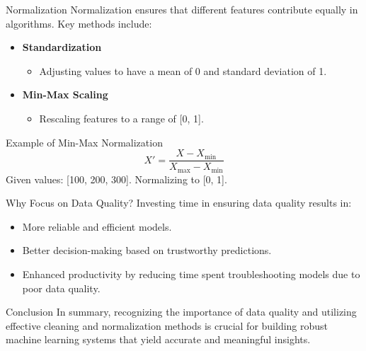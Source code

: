 \documentclass[aspectratio=169]{beamer}
\begin{document}
\begin{frame}{Normalization}
    Normalization ensures that different features contribute equally in algorithms. Key methods include:
    
    \begin{itemize}
        \item \textbf{Standardization}
            \begin{itemize}
                \item Adjusting values to have a mean of 0 and standard deviation of 1.
            \end{itemize}
        \item \textbf{Min-Max Scaling}
            \begin{itemize}
                \item Rescaling features to a range of [0, 1].
            \end{itemize}
    \end{itemize}

    \begin{block}{Example of Min-Max Normalization}
        \begin{equation}
        X' = \frac{X - X_{\text{min}}}{X_{\text{max}} - X_{\text{min}}}
        \end{equation}
        Given values: [100, 200, 300]. Normalizing to [0, 1].
    \end{block}
\end{frame}

\begin{frame}{Why Focus on Data Quality?}
    Investing time in ensuring data quality results in:
    \begin{itemize}
        \item More reliable and efficient models.
        \item Better decision-making based on trustworthy predictions.
        \item Enhanced productivity by reducing time spent troubleshooting models due to poor data quality.
    \end{itemize}
\end{frame}

\begin{frame}{Conclusion}
    In summary, recognizing the importance of data quality and utilizing effective cleaning and normalization methods is crucial for building robust machine learning systems that yield accurate and meaningful insights.
\end{frame}
\end{document}

